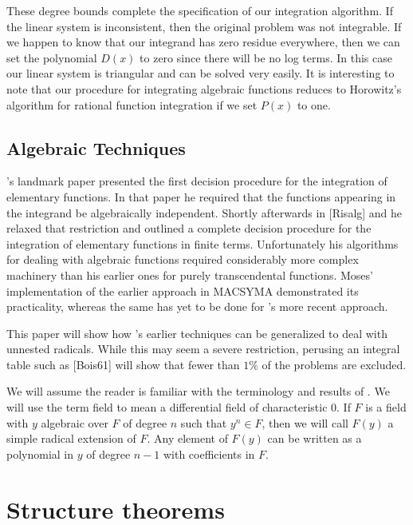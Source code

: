 These degree bounds complete the specification of our integration
algorithm.  If the linear system is inconsistent, then the original
problem was not integrable.  If we happen to know that our integrand
has zero residue everywhere, then we can set the polynomial $D(x)$ to zero
since there will be no log terms.
In this case our linear system is triangular and can be solved very easily.
It is interesting to note that our procedure for integrating algebraic
functions reduces to Horowitz's algorithm for rational function integration
if we set $P(x)$ to one.

\subsection{Algebraic Techniques}

{\Risch}'s landmark paper \cite{Risch1970-na} presented the
first decision 
procedure for the integration of elementary functions.  In that
paper he required that the functions appearing in the integrand be
algebraically independent.  Shortly afterwards in [Risalg]
and \cite{Risch1970-na} he relaxed
that restriction and outlined a complete decision procedure for
the integration of elementary functions in finite terms.
Unfortunately his algorithms for dealing with algebraic functions
required considerably more complex machinery than his earlier
ones for purely transcendental functions.  Moses' implementation
of the earlier approach in MACSYMA \cite{noauthor_1989-as} demonstrated its
practicality, whereas the same has yet to be done for {\Risch}'s 
more recent approach.

This paper will show how {\Risch}'s earlier techniques can be
generalized to deal with unnested radicals.  While this may seem
a severe restriction, perusing an integral table such as [Bois61]
will show that fewer than $1\%$ of the problems are excluded.

We will assume the reader is familiar with the terminology and results
of \cite{Risch1970-na}.  We will use the term field to
mean a differential field of characteristic 0.  If $F$ is a field with
$y$ algebraic over $F$ of degree $n$ such that $y^n \in F$, then we
will call $F(y)$ a simple radical extension of $F$.  Any element of
$F(y)$ can be written as a polynomial in $y$ of degree $n-1$ with
coefficients in $F$.

\section{Structure theorems}

